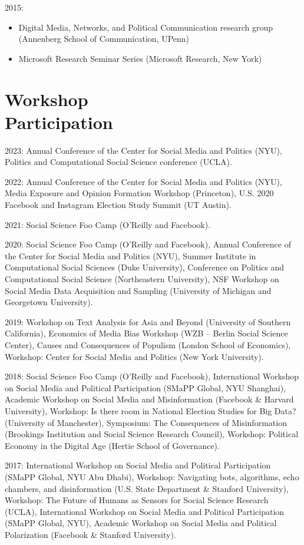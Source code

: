 \documentclass[margin,line,11pt]{resume}
\begin{document}
\begin{resume}
2015:
\begin{itemize}
\item Digital Media, Networks, and Political Communication research group (Annenberg School of Communication, UPenn)
\item Microsoft Research Seminar Series (Microsoft Research, New York)
\end{itemize}

 
        \section{\mysidestyle Workshop\\Participation}
2023: Annual Conference of the Center for Social Media and Politics (NYU), Politics and Computational Social Science conference (UCLA). 

2022: Annual Conference of the Center for Social Media and Politics (NYU), Media Exposure and Opinion Formation Workshop (Princeton), U.S. 2020 Facebook and Instagram Election Study Summit (UT Austin). 

2021: Social Science Foo Camp (O'Reilly and Facebook).

2020: Social Science Foo Camp (O'Reilly and Facebook), Annual Conference of the Center for Social Media and Politics (NYU), Summer Institute in Computational Social Sciences (Duke University), Conference on Politics and Computational Social Science (Northeastern University), NSF Workshop on Social Media Data Acquisition and Sampling (University of Michigan and Georgetown University).
        
2019: Workshop on Text Analysis for Asia and Beyond (University of Southern California), Economics of Media Bias Workshop (WZB -- Berlin Social Science Center), Causes and Consequences of Populism (London School of Economics), Workshop: Center for Social Media and Politics (New York University).
    
      
2018: Social Science Foo Camp (O'Reilly and Facebook), International Workshop on Social Media and Political Participation (SMaPP Global, NYU Shanghai), Academic Workshop on Social Media and Misinformation (Facebook \& Harvard University), Workshop: Is there room in National Election Studies for Big Data? (University of Manchester), Symposium: The Consequences of Misinformation (Brookings Institution and Social Science Research Council), Workshop: Political Economy in the Digital Age (Hertie School of Governance).

2017: International Workshop on Social Media and Political Participation (SMaPP Global, NYU Abu Dhabi), Workshop: Navigating bots, algorithms, echo chambers, and disinformation (U.S. State Department \& Stanford University), Workshop: The Future of Humans as Sensors for Social Science Research (UCLA),  International Workshop on Social Media and Political Participation (SMaPP Global, NYU), Academic Workshop on Social Media and Political Polarization (Facebook \& Stanford University).


\end{resume}
\end{document}
